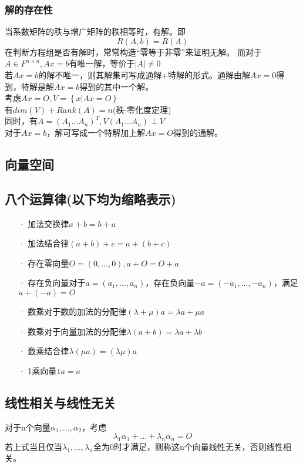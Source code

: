 \documentclass[UTF8]{ctexart}
\begin{document}
\subsubsection{解的存在性}
当系数矩阵的秩与增广矩阵的秩相等时，有解。即
\[\displaystyle R(A,b)=R(A) \]
在判断方程组是否有解时，常常构造“零等于非零”来证明无解。
\indent
而对于$A\in F^{n\times n},Ax=b$有唯一解，等价于$|A|\neq 0$\\
\indent
若$Ax=b$的解不唯一，则其解集可写成通解+特解的形式。通解由解$Ax=\mathit{0}$得到，特解是解$Ax=b$得到的其中一个解。\\
\indent
考虑$Ax=\mathit{O},V=\left\{{x|Ax=\mathit{O}}\right\}$\\
\indent
有$dim(V)+Rank(A)=n$(秩-零化度定理)\\
\indent
同时，有$A=(A_1...A_n)^T,V(A_1...A_n)\perp V$\\
\indent
对于$Ax=b$，解可写成一个特解加上解$Ax=\mathit{O}$得到的通解。
\subsection{向量空间}
\subsection{八个运算律(以下均为缩略表示)}
\begin{itemize}
	\item [·]加法交换律$a+b=b+a$
	\item [·]加法结合律$(a+b)+c=a+(b+c)$
	\item [·]存在零向量$\mathit{O}=(0,...,0),a+\mathit{O}=\mathit{O}+a$
	\item [·]存在负向量对于$a=(a_1,...,a_n)$，存在负向量$-a=(-a_1,...,-a_n)$，满足$a+(-a)=\mathit{O}$
	\item [·]数乘对于数的加法的分配律$(\lambda+\mu)a=\lambda a+\mu a$
	\item [·]数乘对于向量加法的分配律$\lambda(a+b)=\lambda a+\lambda b$
	\item [·]数乘结合律$\lambda(\mu a)=(\lambda \mu)a$
	\item [·]1乘向量$1a=a$
\end{itemize}
\subsection{线性相关与线性无关}
对于n个向量$\alpha_1,...,\alpha_2$，考虑
\[\displaystyle \lambda_1\alpha_1+...+\lambda_n\alpha_n=\mathit{O}\]
\indent
若上式当且仅当$\lambda_1,...,\lambda_n$全为0时才满足，则称这n个向量线性无关，否则线性相关。
\end{document}
